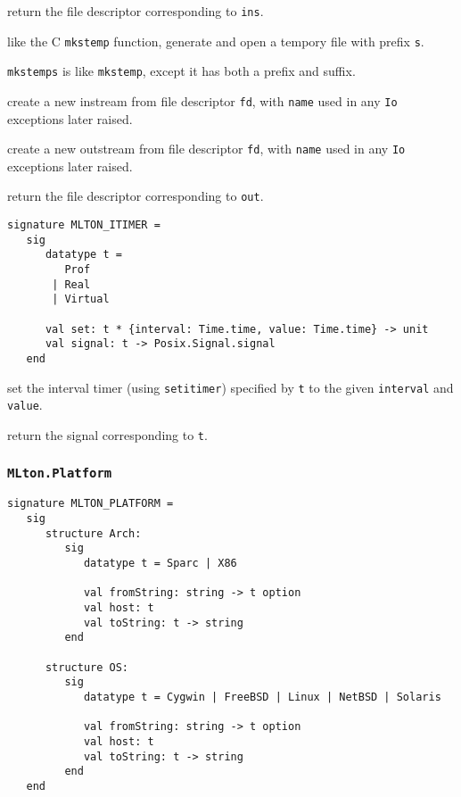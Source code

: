 \begin{description}

 return the file descriptor corresponding to {\tt ins}.

like the C {\tt mkstemp} function, generate and open a tempory file with prefix
{\tt s}.

{\tt mkstemps} is like {\tt mkstemp}, except it has both a prefix and suffix.

 create a new instream from file descriptor
{\tt fd}, with {\tt name} used in any {\tt Io} exceptions later
raised.

 create a new outstream from file descriptor
{\tt  fd}, with {\tt name} used in any {\tt Io} exceptions later
raised.

 return the file descriptor corresponding to
{\tt out}.
\end{description}


\begin{verbatim}
signature MLTON_ITIMER =
   sig
      datatype t =
         Prof
       | Real
       | Virtual

      val set: t * {interval: Time.time, value: Time.time} -> unit
      val signal: t -> Posix.Signal.signal
   end
\end{verbatim}

\begin{description}
set the interval timer (using {\tt setitimer}) specified by {\tt t} to
the given {\tt interval} and {\tt value}.

return the signal corresponding to {\tt t}.
\end{description}
%
\subsubsection{\tt MLton.Platform}

\begin{verbatim}
signature MLTON_PLATFORM =
   sig
      structure Arch:
         sig
            datatype t = Sparc | X86

            val fromString: string -> t option
            val host: t
            val toString: t -> string
         end
         
      structure OS:
         sig
            datatype t = Cygwin | FreeBSD | Linux | NetBSD | Solaris

            val fromString: string -> t option
            val host: t
            val toString: t -> string
         end
   end
\end{verbatim}

